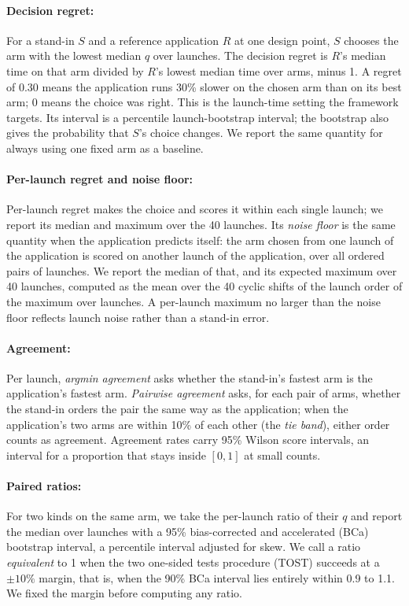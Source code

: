 \documentclass[11pt]{article}
\begin{document}
\paragraph{Decision regret:} For a stand-in $S$ and a reference application $R$ at one
design point, $S$ chooses the arm with the lowest median $q$ over launches. The decision
regret is $R$'s median time on that arm divided by $R$'s lowest median time over arms,
minus 1. A regret of 0.30 means the application runs 30\% slower on the chosen arm than on
its best arm; 0 means the choice was right. This is the launch-time setting the framework
targets. Its interval is a percentile launch-bootstrap interval; the bootstrap also gives
the probability that $S$'s choice changes. We report the same quantity for always using
one fixed arm as a baseline.

\paragraph{Per-launch regret and noise floor:} Per-launch regret makes the choice and scores
it within each single launch; we report its median and maximum over the 40 launches. Its \emph{noise floor} is the
same quantity when the application predicts itself: the arm chosen from one launch of the
application is scored on another launch of the application, over all ordered pairs of
launches. We report the median of that, and its expected maximum over 40 launches,
computed as the mean over the 40 cyclic shifts of the launch order of the maximum over
launches. A per-launch maximum no larger than the noise floor reflects launch noise rather
than a stand-in error.

\paragraph{Agreement:} Per launch, \emph{argmin agreement} asks whether the stand-in's
fastest arm is the application's fastest arm. \emph{Pairwise agreement} asks, for each
pair of arms, whether the stand-in orders the pair the same way as the application; when
the application's two arms are within 10\% of each other (the \emph{tie band}), either
order counts as agreement. Agreement rates carry 95\% Wilson score intervals, an interval
for a proportion that stays inside $[0,1]$ at small counts.

\paragraph{Paired ratios:} For two kinds on the same arm, we take the per-launch ratio of
their $q$ and report the median over launches with a 95\% bias-corrected and accelerated
(BCa) bootstrap interval, a percentile interval adjusted for skew. We call a ratio
\emph{equivalent} to 1 when the two one-sided tests procedure (TOST) succeeds at a $\pm
10\%$ margin, that is, when the 90\% BCa interval lies entirely within 0.9 to 1.1. We
fixed the margin before computing any ratio.
\end{document}
